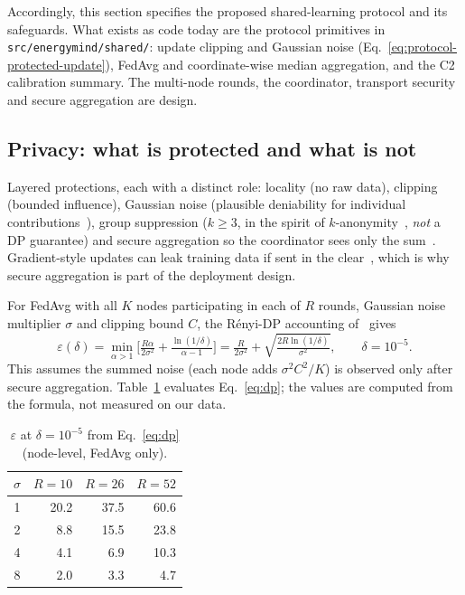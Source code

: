 \documentclass[11pt,a4paper]{article}
\newcommand{\code}[1]{\texttt{#1}}
\newcommand{\hdr}{\rowcolor{emblue!15}}
\begin{document}
Accordingly, this section specifies the proposed shared-learning
protocol and its safeguards. What exists as code today are the protocol primitives in
\code{src/energymind/shared/}: update clipping and Gaussian noise
(Eq.~\ref{eq:protocol-protected-update}), FedAvg and coordinate-wise median
aggregation, and the C2 calibration summary. The multi-node rounds, the
coordinator, transport security and secure aggregation are design.
\subsection{Privacy: what is protected and what is not}

Layered protections, each with a distinct role: locality (no raw data), clipping (bounded influence), Gaussian noise (plausible deniability for individual contributions~\cite{dwork2014,abadi2016}), group suppression ($k\!\ge\!3$, in the spirit of $k$-anonymity~\cite{sweeney2002}, \emph{not} a DP guarantee) and secure aggregation so the coordinator sees only the sum~\cite{bonawitz2017}. Gradient-style updates can leak training data if sent in the clear~\cite{zhu2019}, which is why secure aggregation is part of the deployment design.

For FedAvg with all $K$ nodes participating in each of $R$ rounds, Gaussian noise multiplier $\sigma$ and clipping bound $C$, the R\'enyi-DP accounting of~\cite{mironov2017} gives
\begin{equation}
 \varepsilon(\delta)=\min_{\alpha>1}\Big[\tfrac{R\alpha}{2\sigma^2}+\tfrac{\ln(1/\delta)}{\alpha-1}\Big]
 =\tfrac{R}{2\sigma^2}+\sqrt{\tfrac{2R\ln(1/\delta)}{\sigma^2}},\qquad\delta=10^{-5}.
 \label{eq:dp}
\end{equation}
This assumes the summed noise (each node adds $\sigma^2C^2/K$) is observed only after secure aggregation. Table~\ref{tab:eps} evaluates Eq.~\eqref{eq:dp}; the values are computed from the formula, not measured on our data.

\begin{table}[H]
\centering\small
\caption{$\varepsilon$ at $\delta=10^{-5}$ from Eq.~\eqref{eq:dp} (node-level, FedAvg only).}
\label{tab:eps}
\begin{tabular}{@{}c rrr@{}}
\toprule\hdr
$\sigma$ & $R=10$ & $R=26$ & $R=52$ \\
\midrule
1 & 20.2 & 37.5 & 60.6 \\
2 & 8.8 & 15.5 & 23.8 \\
4 & 4.1 & 6.9 & 10.3 \\
8 & 2.0 & 3.3 & 4.7 \\
\bottomrule
\end{tabular}
\end{table}
\end{document}
